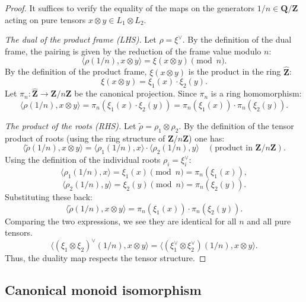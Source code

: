 \documentclass[11pt,a4paper]{article}
\newcommand{\Q}{\mathbf{Q}}
\newcommand{\Z}{\mathbf{Z}}
\theoremstyle{plain}
\theoremstyle{definition} %
\begin{document}
\begin{proof}
It suffices to verify the equality of the maps on the generators $1/n \in \Q/\Z$ acting on pure tensors $x \otimes y \in L_1 \otimes L_2$.\vspace{.03in}

\emph{The dual of the product frame (LHS).}
Let $\rho = \xi^\vee$. By the definition of the dual frame, the pairing is given by the reduction of the frame value modulo $n$:
\[
\langle \rho(1/n), x \otimes y \rangle = \xi(x \otimes y) \pmod n.
\]
By the definition of the product frame, $\xi(x \otimes y)$ is the product in the ring $\widehat{\Z}$:
\[
\xi(x \otimes y) = \xi_1(x) \cdot \xi_2(y).
\]
Let $\pi_n: \widehat{\Z} \to \Z/n\Z$ be the canonical projection. Since $\pi_n$ is a ring homomorphism:
\[
\langle \rho(1/n), x \otimes y \rangle = \pi_n\left( \xi_1(x) \cdot \xi_2(y) \right) = \pi_n(\xi_1(x)) \cdot \pi_n(\xi_2(y)).
\]

\emph{The product of the roots (RHS).}
Let $\tilde{\rho} = \rho_1 \otimes \rho_2$. By the definition of the tensor product of roots (using the ring structure of $\Z/n\Z$) one has:
\[
\langle \tilde{\rho}(1/n), x \otimes y \rangle = \langle \rho_1(1/n), x \rangle \cdot \langle \rho_2(1/n), y \rangle \quad (\text{product in } \Z/n\Z).
\]
Using the definition of the individual roots $\rho_i = \xi_i^\vee$:
\[
\langle \rho_1(1/n), x \rangle = \xi_1(x) \pmod n = \pi_n(\xi_1(x)),
\]
\[
\langle \rho_2(1/n), y \rangle = \xi_2(y) \pmod n = \pi_n(\xi_2(y)).
\]
Substituting these back:
\[
\langle \tilde{\rho}(1/n), x \otimes y \rangle = \pi_n(\xi_1(x)) \cdot \pi_n(\xi_2(y)).
\]
Comparing the two expressions, we see they are identical for all $n$ and all pure tensors.
\[
\langle (\xi_1 \otimes \xi_2)^\vee(1/n), x \otimes y \rangle = \langle (\xi_1^\vee \otimes \xi_2^\vee)(1/n), x \otimes y \rangle.
\]
Thus, the duality map respects the tensor structure.
\end{proof}


\subsection{Canonical monoid isomorphism}
\end{document}
